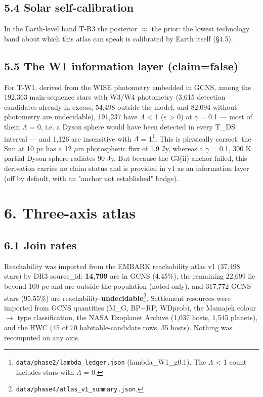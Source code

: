 \documentclass[11pt]{article}
\begin{document}
\subsection*{5.4 Solar self-calibration}
\noindent In the Earth-level band T-R3 the posterior \(\approx\) the prior: the lowest technology band about which this atlas can speak is calibrated by Earth itself (\S{}4.5).\par\smallskip

\subsection*{5.5 The W1 information layer (claim=false)}
\noindent For T-W1, derived from the WISE photometry embedded in GCNS, among the 192,363 main-sequence stars with W3/W4 photometry (3,615 detection candidates already in excess, 54,498 outside the model, and 82,094 without photometry are undecidable), 191,237 have \(\Lambda\) < 1 (\(\varepsilon\) > 0) at \(\gamma\) = 0.1 --- most of them \(\Lambda\) = 0, i.e. a Dyson sphere would have been detected in every T\_DS interval --- and 1,126 are insensitive with \(\Lambda\) = 1\footnote{\texttt{data/phase2/lambda\_ledger.json} (lambda\_W1\_g0.1). The \(\Lambda\) < 1 count includes stars with \(\Lambda\) = 0.}. This is physically correct: the Sun at 10 pc has a 12 \(\mu\)m photospheric flux of 1.9 Jy, whereas a \(\gamma\) = 0.1, 300 K partial Dyson sphere radiates 90 Jy. But because the G3(ii) anchor failed, this derivation carries no claim status and is provided in v1 as an information layer (off by default, with an "anchor not established" badge).\par\smallskip


\section*{6. Three-axis atlas}

\subsection*{6.1 Join rates}
\noindent Reachability was imported from the EMBARK reachability atlas v1 (37,498 stars) by DR3 source\_id: \textbf{14,799} are in GCNS (4.45\%), the remaining 22,699 lie beyond 100 pc and are outside the population (noted only), and 317,772 GCNS stars (95.55\%) are reachability-\textbf{undecidable}\footnote{\texttt{data/phase4/atlas\_v1\_summary.json}.}. Settlement resources were imported from GCNS quantities (M\_G, BP\(-\)RP, WDprob), the Mamajek colour \(\rightarrow\) type classification, the NASA Exoplanet Archive (1,037 hosts, 1,545 planets), and the HWC (45 of 70 habitable-candidate rows, 35 hosts). Nothing was recomputed on any axis.\par\smallskip
\end{document}
